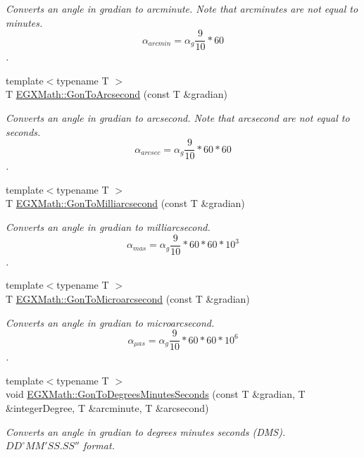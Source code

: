 \begin{DoxyCompactItemize}
\begin{DoxyCompactList}\small\item\em Converts an angle in gradian to arcminute. Note that arcminutes are not equal to minutes. \[\alpha_{arcmin}=\alpha_{g}\frac{9}{10} * 60\]. \end{DoxyCompactList}\item 
{\footnotesize template$<$typename T $>$ }\\T \mbox{\hyperlink{group___e_g_x_math-_angle_conversions-_gon_gad4f34877c74cc444e7b741b99cd20d5a}{E\+G\+X\+Math\+::\+Gon\+To\+Arcsecond}} (const T \&gradian)
\begin{DoxyCompactList}\small\item\em Converts an angle in gradian to arcsecond. Note that arcsecond are not equal to seconds. \[\alpha_{arcsec}=\alpha_{g}\frac{9}{10} * 60 * 60\]. \end{DoxyCompactList}\item 
{\footnotesize template$<$typename T $>$ }\\T \mbox{\hyperlink{group___e_g_x_math-_angle_conversions-_gon_ga63013f99af7ec2b9628b8b87eb2e2a92}{E\+G\+X\+Math\+::\+Gon\+To\+Milliarcsecond}} (const T \&gradian)
\begin{DoxyCompactList}\small\item\em Converts an angle in gradian to milliarcsecond. \[\alpha_{mas}=\alpha_{g}\frac{9}{10} * 60 * 60 * 10^3\]. \end{DoxyCompactList}\item 
{\footnotesize template$<$typename T $>$ }\\T \mbox{\hyperlink{group___e_g_x_math-_angle_conversions-_gon_gae3f14ff3441def6d88fed69f2466cf82}{E\+G\+X\+Math\+::\+Gon\+To\+Microarcsecond}} (const T \&gradian)
\begin{DoxyCompactList}\small\item\em Converts an angle in gradian to microarcsecond. \[\alpha_{\mu as}=\alpha_{g}\frac{9}{10} * 60 * 60 * 10^6\]. \end{DoxyCompactList}\item 
{\footnotesize template$<$typename T $>$ }\\void \mbox{\hyperlink{group___e_g_x_math-_angle_conversions-_gon_gabd1dfe541d8caf9ee5ed261fe6f08261}{E\+G\+X\+Math\+::\+Gon\+To\+Degrees\+Minutes\+Seconds}} (const T \&gradian, T \&integer\+Degree, T \&arcminute, T \&arcsecond)
\begin{DoxyCompactList}\small\item\em Converts an angle in gradian to degrees minutes seconds (D\+MS). ${DD}^{\circ}{MM}'{SS.SS}''$ format. \end{DoxyCompactList}\item 

\end{DoxyCompactItemize}
